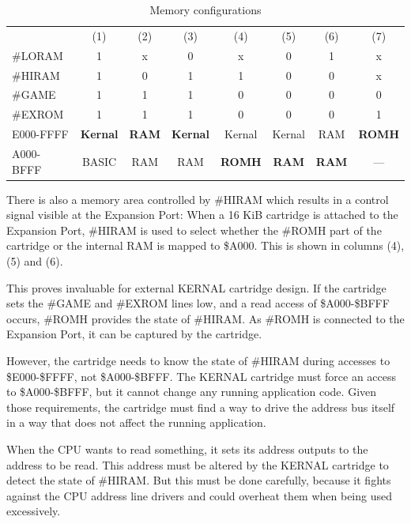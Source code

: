 \documentclass[a4paper,oneside]{memoir}
\begin{document}
\begin{table}
    \centering
    \begin{tabularx}{\textwidth}{lccccccc}

        \toprule
                & (1) & (2) & (3) & (4) & (5) & (6) & (7) \\[3pt]
        \#LORAM & 1 & x & 0 & x & 0 & 1 & x \\[3pt]
        \#HIRAM & 1 & 0 & 1 & 1 & 0 & 0 & x \\[3pt]
        \#GAME  & 1 & 1 & 1 & 0 & 0 & 0 & 0 \\[3pt]
        \#EXROM & 1 & 1 & 1 & 0 & 0 & 0 & 1 \\[3pt]
        \midrule
        E000-FFFF & \textbf{Kernal} & \textbf{RAM} & \textbf{Kernal} &
          Kernal         & Kernal        & RAM           & \textbf{ROMH} \\[3pt]
        A000-BFFF & BASIC            & RAM           & RAM              &
          \textbf{ROMH} & \textbf{RAM} & \textbf{RAM} & --- \\[3pt]
        \bottomrule
    \end{tabularx}
    \caption{Memory configurations}
    \label{tab:mem-configs}
\end{table}

There is also a memory area controlled by \#HIRAM which results in a
control signal visible at the Expansion Port: When a 16 KiB
cartridge is attached to the Expansion Port, \#HIRAM is used to
select whether the \#ROMH part of the cartridge or the internal RAM
is mapped to \$A000. This is shown in columns (4), (5) and (6).

This proves invaluable for external KERNAL cartridge design. If the
cartridge sets the \#GAME and \#EXROM lines low, and a read
access of \$A000-\$BFFF occurs, \#ROMH provides the state of
\#HIRAM. As \#ROMH is connected to the Expansion Port, it can be
captured by the cartridge.

However, the cartridge needs to know the state of \#HIRAM during 
accesses to \$E000-\$FFFF, not \$A000-\$BFFF. The KERNAL
cartridge must force an access to \$A000-\$BFFF, but it cannot
change any running application code. Given those requirements, the
cartridge must find a way to drive the address bus itself in a way
that does not affect the running application.

When the CPU wants to read something, it sets its address outputs to
the address to be read. This address must be altered by the KERNAL 
cartridge to detect the state of \#HIRAM. But this must be done 
carefully, because it fights against the CPU address
line drivers and could overheat them when being used excessively.
\end{document}
